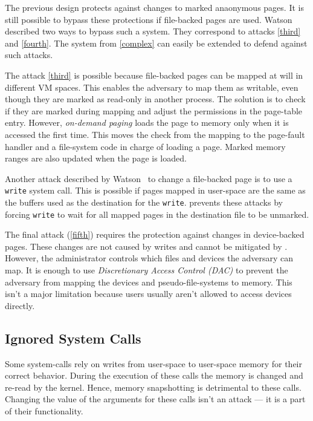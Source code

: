 The previous design protects against changes to marked anaonymous pages. It is
still possible to bypass these protections if file-backed pages are used.
Watson~\cite{watson2007exploiting} described two ways to bypass such a system.
They correspond to attacks \autoref{third} and \autoref{fourth}. The system from
\autoref{complex} can easily be extended to defend against such attacks.

The attack \autoref{third} is possible because file-backed pages can be mapped
at will in different VM spaces. This enables the adversary to map them as
writable, even though they are marked as read-only in another process. The 
solution is to check if they are marked during mapping and adjust the permissions
in the page-table entry. However, \emph{on-demand paging} loads the page to memory
only when it is accessed the first time. This moves the check from the mapping to
the page-fault handler and a file-system code in charge of loading a page. Marked
memory ranges are also updated when the page is loaded.

Another attack described by Watson~\cite{watson2007exploiting} to change a
file-backed page is to use a \texttt{write} system call. This is possible if
pages mapped in user-space are the same as the buffers used as the destination
for the \texttt{write}. \sysname prevents these attacks by forcing
\texttt{write} to wait for all mapped pages in the destination file to be
unmarked.

The final attack (\autoref{fifth}) requires the protection against changes in
device-backed pages. These changes are not caused by writes and cannot be
mitigated by \sysname. However, the administrator controls which files and
devices the adversary can map. It is enough to use \emph{Discretionary Access
Control (DAC)} to prevent the adversary from mapping the devices and
pseudo-file-systems to memory. This isn't a major limitation because users
usually aren't allowed to access devices directly.

\subsection{Ignored System Calls}
\label{subsec:ignoredcalls}

Some system-calls rely on writes from user-space to user-space memory for their
correct behavior. During the execution of these calls the memory is changed and
re-read by the kernel. Hence, memory snapshotting is detrimental to these calls.
Changing the value of the arguments for these calls isn't an attack --- it is a
part of their functionality.

